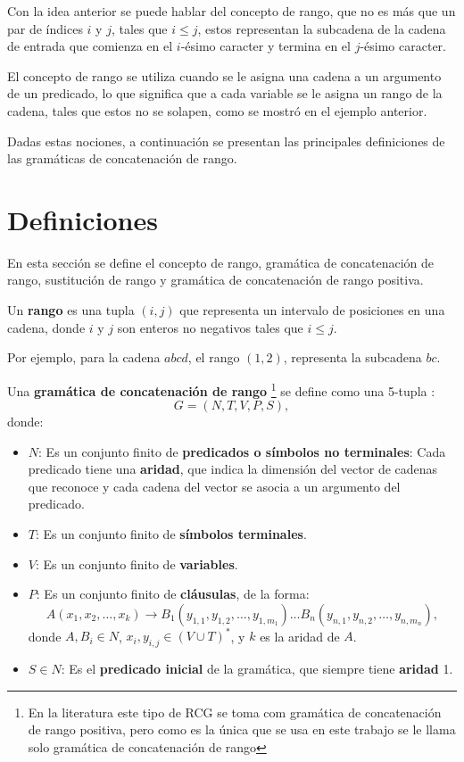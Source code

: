 Con la idea anterior se puede hablar del concepto de rango, que no es más que un par de índices $i$ y $j$, tales que $i\leq j$, estos
representan la subcadena de la cadena de entrada que comienza en el $i$-ésimo caracter y termina en el $j$-ésimo caracter.

El concepto de rango se utiliza cuando se le asigna una cadena a un argumento de un predicado, lo que significa que a cada variable se le asigna un rango de la cadena, tales que estos no se solapen, como se mostró en el ejemplo anterior.

Dadas estas nociones, a continuación se presentan las principales definiciones de las gramáticas de concatenación de rango.

\section{Definiciones}

En esta sección se define el concepto de rango, gramática de concatenación de rango, sustitución de rango y gramática de concatenación de rango positiva.

\begin{definition}
    Un \textbf{rango} es una tupla $(i, j)$ que representa un intervalo de posiciones en una cadena, donde $i$ y $j$ son enteros no negativos tales que $i \leq j$.    
\end{definition}

Por ejemplo, para la cadena $abcd$, el rango $(1,2)$, representa la subcadena $bc$.

\begin{definition}
    Una \textbf{gramática de concatenación de rango} \footnote{En la literatura este tipo de RCG se toma com gramática de concatenación de rango positiva, pero como es la única que
        se usa en este trabajo se le llama solo gramática de concatenación de rango} se define como una 5-tupla
    :
    \[
        G = (N, T, V, P, S),
    \]
    donde:
    
    \begin{itemize}
        \item $N$: Es un conjunto finito de \textbf{predicados o símbolos no terminales}: Cada predicado tiene una \textbf{aridad}, que indica la dimensión del vector de cadenas que reconoce y cada cadena del vector se asocia a un argumento del predicado.
        \item $T$: Es un conjunto finito de \textbf{símbolos terminales}.
        \item $V$: Es un conjunto finito de \textbf{variables}.
        \item $P$: Es un conjunto finito de \textbf{cláusulas}, de la forma:
              \[
                  A(x_1, x_2, \ldots, x_k) \to B_1(y_{1,1}, y_{1,2}, \ldots, y_{1,m_1}) \ldots B_n(y_{n,1}, y_{n,2}, \ldots, y_{n,m_n}),
              \]
              donde $A, B_i \in N$, $x_i, y_{i,j} \in (V \cup T)^*$, y $k$ es la aridad de $A$.
        \item $S \in N$: Es el \textbf{predicado inicial} de la gramática, que siempre tiene \textbf{aridad} 1.
    \end{itemize}
\end{definition}



